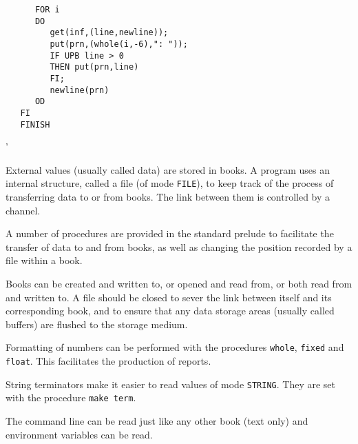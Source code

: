 \begin{exercise}
\begin{verbatim}
      FOR i
      DO
         get(inf,(line,newline));
         put(prn,(whole(i,-6),": "));
         IF UPB line > 0
         THEN put(prn,line)
         FI;
         newline(prn)
      OD
   FI
   FINISH
\end{verbatim}
'
\end{exercise}

External values (usually called data) are stored in books. A program
uses an internal structure, called a file (of mode \verb|FILE|), to
keep track of the process of transferring data to or from books. The
link between them is controlled by a channel.

A number of procedures are provided in the standard prelude to
facilitate the transfer of data to and from books, as well as changing
the position recorded by a file within a book.

Books can be created and written to, or opened and read from, or both
read from and written to. A file should be closed to sever the link
between itself and its corresponding book, and to ensure that any data
storage areas (usually called buffers) are flushed to the storage
medium.

Formatting of numbers can be performed with the procedures
\verb|whole|, \verb|fixed| and \verb|float|. This facilitates the
production of reports.

String terminators make it easier to read values of mode \verb|STRING|.
They are set with the procedure \verb|make term|.

The command line can be read just like any other book (text only) and
environment variables can be read.

